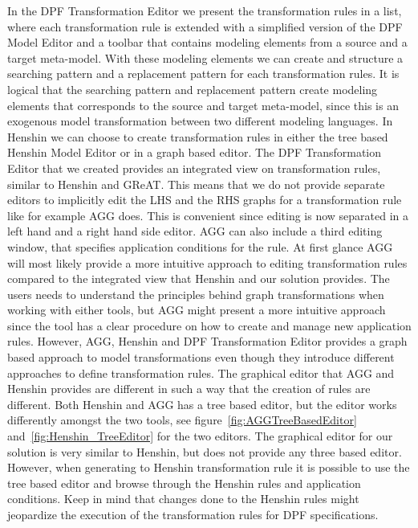 In the DPF Transformation Editor we present the transformation rules in a list,
where each transformation rule is extended with a simplified version of the DPF
Model Editor and a toolbar that contains modeling elements from a source and a
target meta-model. With these modeling elements we can create and structure a
searching pattern and a replacement pattern for each transformation rules. It
is logical that the searching pattern and replacement pattern create modeling
elements that corresponds to the source and target meta-model, since this is an
exogenous model transformation between two different modeling languages. In
Henshin we can choose to create transformation rules in either the tree based
Henshin Model Editor or in a graph based editor.
The DPF Transformation Editor that we created provides an integrated view on
transformation rules, similar to Henshin and GReAT. This means that
we do not provide separate editors to implicitly edit the LHS and the RHS
graphs for a transformation rule like for example AGG does. This is convenient
since editing is now separated in a left hand and a right hand side editor. AGG
can also include a third editing window, that specifies application conditions
for the rule. At first glance AGG will most likely provide a more intuitive
approach to editing transformation rules compared to the integrated view that
Henshin and our solution provides. The users needs to understand the principles
behind graph transformations when working with either tools, but AGG might
present a more intuitive approach since the tool has a clear procedure on how
to create and manage new application rules. However, AGG, Henshin and DPF
Transformation Editor provides a graph based approach to model transformations
even though they introduce different approaches to define transformation rules.
The graphical editor that AGG and Henshin provides are different in such a way
that the creation of rules are different. Both Henshin and AGG has a tree based
editor, but the editor works differently amongst the two tools, see
figure~\ref{fig:AGGTreeBasedEditor} and~\ref{fig:Henshin_TreeEditor} for the
two editors. The graphical editor for our solution is very similar to Henshin,
but does not provide any three based editor. However, when generating to
Henshin transformation rule it is possible to use the tree based editor and
browse through the Henshin rules and application conditions. Keep in mind that
changes done to the Henshin rules might jeopardize the execution of the
transformation rules for DPF specifications.

